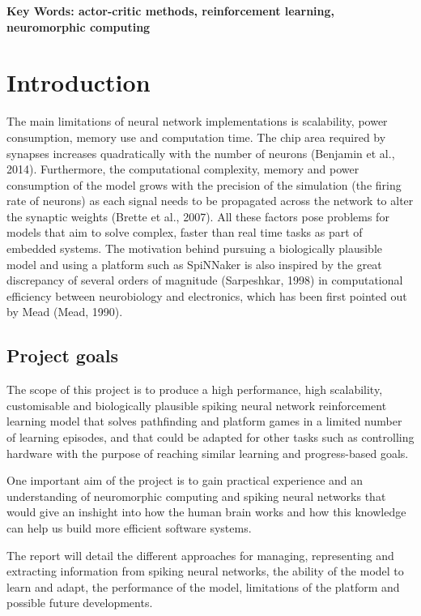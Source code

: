 \documentclass[10pt]{article}
\begin{document}
    \textbf{Key Words: actor-critic methods, reinforcement learning, neuromorphic computing}


    \tableofcontents
    \section{Introduction}
    
    The main limitations of neural network implementations is scalability, power consumption, memory use and computation time. The chip area required by synapses increases quadratically with the number of neurons (Benjamin et al., 2014). Furthermore, the computational complexity, memory and power consumption of the model grows with the precision of the simulation (the firing rate of neurons) as each signal needs to be propagated across the network to alter the synaptic weights (Brette et al., 2007). All these factors pose problems for models that aim to solve complex, faster than real time tasks as part of embedded systems. The motivation behind pursuing a biologically plausible model and using a platform such as SpiNNaker is also inspired by the great discrepancy of several orders of magnitude (Sarpeshkar, 1998) in computational efficiency between neurobiology and electronics, which has been first pointed out by Mead (Mead, 1990).

    \subsection{Project goals}

    The scope of this project is to produce a high performance, high scalability, customisable and biologically plausible spiking neural network reinforcement learning model that solves pathfinding and platform games in a limited number of learning episodes, and that could be adapted for other tasks such as controlling hardware with the purpose of reaching similar learning and progress-based goals.

    One important aim of the project is to gain practical experience and an understanding of neuromorphic computing and spiking neural networks that would give an inshight into how the human brain works and how this knowledge can help us build more efficient software systems.

    The report will detail the different approaches for managing, representing and extracting information from spiking neural networks, the ability of the model to learn and adapt, the performance of the model, limitations of the platform and possible future developments.
\end{document}
